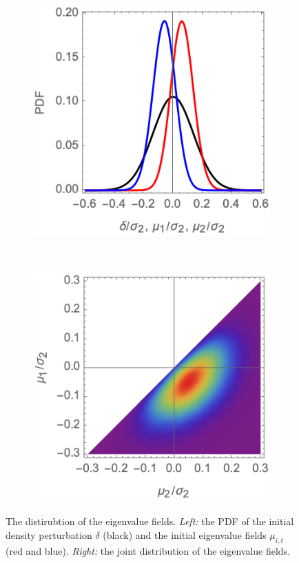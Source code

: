 \documentclass[a4paper, 11pt]{article}
\begin{document}
\begin{figure}
\centering
\begin{subfigure}[b]{0.45\textwidth}
\includegraphics[width=\textwidth]{eigen_dens}
\end{subfigure}~
\begin{subfigure}[b]{0.45\textwidth}
\includegraphics[width=\textwidth]{joint_eigen}
\end{subfigure}
\caption{The distirubtion of the eigenvalue fields. \textit{Left:} the PDF of the initial density perturbation $\delta$ (black) and the initial eigenvalue fields $\mu_{i,t}$ (red and blue). \textit{Right:} the joint distribution of the eigenvalue fields.}\label{fig:eigen_stats}
\end{figure}
\end{document}
